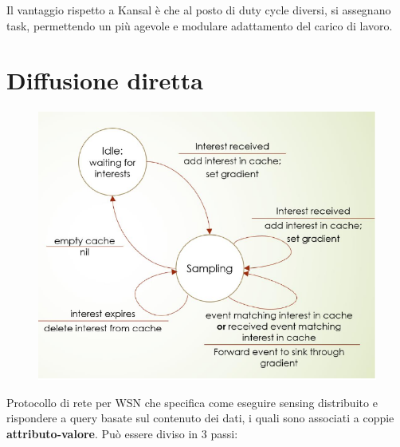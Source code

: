 Il vantaggio rispetto a Kansal è che al posto di duty cycle diversi, si assegnano task, permettendo un più agevole e modulare adattamento del carico di lavoro.  

\section{Diffusione diretta}

\begin{figure}[htbp]
   \centering
   \includegraphics{images/questions/Schermata del 2023-10-20 12-12-43.png}
   \label{fig:dom29}
\end{figure}

Protocollo di rete per WSN che specifica come eseguire sensing distribuito e rispondere a query basate sul contenuto dei dati, i quali sono associati a coppie \textbf{attributo-valore}.
Può essere diviso in 3 passi:

